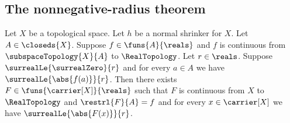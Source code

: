 \subsection{The nonnegative-radius theorem}

\begin{theorem}\label{tietze_extension_bounded_real_from_normal_shrinker}
    Let $X$ be a topological space.
    Let $h$ be a normal shrinker for $X$.
    Let $A\in\closeds{X}$.
    Suppose $f\in\funs{A}{\reals}$ and $f$ is continuous from
        $\subspaceTopology{X}{A}$ to $\RealTopology$.
    Let $r\in\reals$.
    Suppose $\surrealLe{\surrealZero}{r}$ and
        for every $a\in A$ we have $\surrealLe{\abs{f(a)}}{r}$.
    Then there exists $F\in\funs{\carrier[X]}{\reals}$ such that
        $F$ is continuous from $X$ to $\RealTopology$ and
        $\restrl{F}{A}=f$ and
        for every $x\in\carrier[X]$ we have
            $\surrealLe{\abs{F(x)}}{r}$.
\end{theorem}
